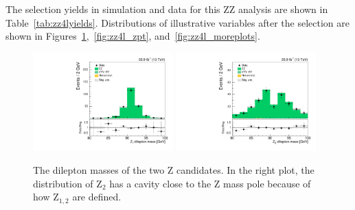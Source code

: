 The selection yields in simulation and data for this ZZ analysis are shown in Table~\ref{tab:zz4lyields}.
Distributions of illustrative variables after the selection are shown in Figures~\ref{fig:zz4l_mll},~\ref{fig:zz4l_zpt}, and~\ref{fig:zz4l_moreplots}.

\begin{figure}[!hb]
\centering
\includegraphics[width=0.48\textwidth]{figures/dibosons/zz4l/mZ1.pdf}
\includegraphics[width=0.48\textwidth]{figures/dibosons/zz4l/mZ2.pdf}
\caption{The dilepton masses of the two Z candidates. 
In the right plot, the distribution of $\mathrm{Z}_{2}$ has a cavity close to the Z mass pole because of how $\mathrm{Z}_{1,2}$ are defined.
\label{fig:zz4l_mll}}
\end{figure}

